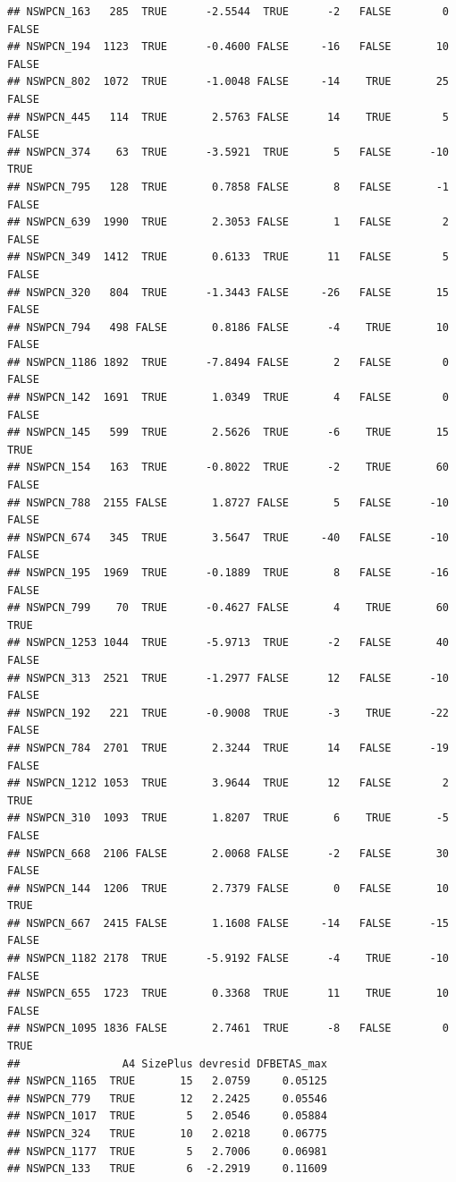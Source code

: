 \documentclass{article}\usepackage[]{graphicx}\usepackage[]{color}
\makeatletter
\newenvironment{kframe}{%
 \def\at@end@of@kframe{}%
 \ifinner\ifhmode%
  \def\at@end@of@kframe{\end{minipage}}%
  \begin{minipage}{\columnwidth}%
 \fi\fi%
 \def\FrameCommand##1{\hskip\@totalleftmargin \hskip-\fboxsep
 \colorbox{shadecolor}{##1}\hskip-\fboxsep
     \hskip-\linewidth \hskip-\@totalleftmargin \hskip\columnwidth}%
 \MakeFramed {\advance\hsize-\width
   \@totalleftmargin\z@ \linewidth\hsize
   \@setminipage}}%
 {\par\unskip\endMakeFramed%
 \at@end@of@kframe}
\newenvironment{knitrout}{}{} %
\makeatother
\begin{document}
\begin{knitrout}
\begin{kframe}
\begin{verbatim}
## NSWPCN_163   285  TRUE      -2.5544  TRUE      -2   FALSE        0 FALSE
## NSWPCN_194  1123  TRUE      -0.4600 FALSE     -16   FALSE       10 FALSE
## NSWPCN_802  1072  TRUE      -1.0048 FALSE     -14    TRUE       25 FALSE
## NSWPCN_445   114  TRUE       2.5763 FALSE      14    TRUE        5 FALSE
## NSWPCN_374    63  TRUE      -3.5921  TRUE       5   FALSE      -10  TRUE
## NSWPCN_795   128  TRUE       0.7858 FALSE       8   FALSE       -1 FALSE
## NSWPCN_639  1990  TRUE       2.3053 FALSE       1   FALSE        2 FALSE
## NSWPCN_349  1412  TRUE       0.6133  TRUE      11   FALSE        5 FALSE
## NSWPCN_320   804  TRUE      -1.3443 FALSE     -26   FALSE       15 FALSE
## NSWPCN_794   498 FALSE       0.8186 FALSE      -4    TRUE       10 FALSE
## NSWPCN_1186 1892  TRUE      -7.8494 FALSE       2   FALSE        0 FALSE
## NSWPCN_142  1691  TRUE       1.0349  TRUE       4   FALSE        0 FALSE
## NSWPCN_145   599  TRUE       2.5626  TRUE      -6    TRUE       15  TRUE
## NSWPCN_154   163  TRUE      -0.8022  TRUE      -2    TRUE       60 FALSE
## NSWPCN_788  2155 FALSE       1.8727 FALSE       5   FALSE      -10 FALSE
## NSWPCN_674   345  TRUE       3.5647  TRUE     -40   FALSE      -10 FALSE
## NSWPCN_195  1969  TRUE      -0.1889  TRUE       8   FALSE      -16 FALSE
## NSWPCN_799    70  TRUE      -0.4627 FALSE       4    TRUE       60  TRUE
## NSWPCN_1253 1044  TRUE      -5.9713  TRUE      -2   FALSE       40 FALSE
## NSWPCN_313  2521  TRUE      -1.2977 FALSE      12   FALSE      -10 FALSE
## NSWPCN_192   221  TRUE      -0.9008  TRUE      -3    TRUE      -22 FALSE
## NSWPCN_784  2701  TRUE       2.3244  TRUE      14   FALSE      -19 FALSE
## NSWPCN_1212 1053  TRUE       3.9644  TRUE      12   FALSE        2  TRUE
## NSWPCN_310  1093  TRUE       1.8207  TRUE       6    TRUE       -5 FALSE
## NSWPCN_668  2106 FALSE       2.0068 FALSE      -2   FALSE       30 FALSE
## NSWPCN_144  1206  TRUE       2.7379 FALSE       0   FALSE       10  TRUE
## NSWPCN_667  2415 FALSE       1.1608 FALSE     -14   FALSE      -15 FALSE
## NSWPCN_1182 2178  TRUE      -5.9192 FALSE      -4    TRUE      -10 FALSE
## NSWPCN_655  1723  TRUE       0.3368  TRUE      11    TRUE       10 FALSE
## NSWPCN_1095 1836 FALSE       2.7461  TRUE      -8   FALSE        0  TRUE
##                A4 SizePlus devresid DFBETAS_max
## NSWPCN_1165  TRUE       15   2.0759     0.05125
## NSWPCN_779   TRUE       12   2.2425     0.05546
## NSWPCN_1017  TRUE        5   2.0546     0.05884
## NSWPCN_324   TRUE       10   2.0218     0.06775
## NSWPCN_1177  TRUE        5   2.7006     0.06981
## NSWPCN_133   TRUE        6  -2.2919     0.11609

\end{verbatim}
\end{kframe}
\end{knitrout}
\end{document}
